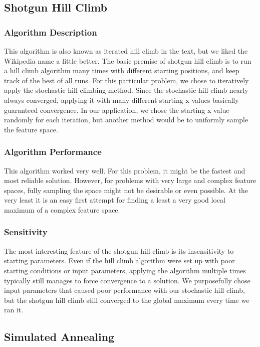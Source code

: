 \subsection{Shotgun Hill Climb}

\subsubsection{Algorithm Description}

This algorithm is also known as iterated hill climb in the text, but we liked the Wikipedia name a little better. The basic premise of shotgun hill climb is to run a hill  climb algorithm many times with different starting positions, and keep track of the best of all runs. For this particular problem, we chose to iteratively apply the stochastic hill climbing method. Since the stochastic hill climb nearly always converged, applying it with many different starting x values basically guaranteed convergence. In our application, we chose the starting x value randomly for each iteration, but another method would be to uniformly sample the feature space.

\subsubsection{Algorithm Performance}

This algorithm worked very well. For this problem, it might be the fastest and most reliable solution. However, for problems with very large and complex feature spaces, fully sampling the space might not be desirable or even possible. At the very least it is an easy first attempt for finding a least a very good local maximum of a complex feature space.

\subsubsection{Sensitivity}

The most interesting feature of the shotgun hill climb is its insensitivity to starting parameters. Even if the hill climb algorithm were set up with poor starting conditions or input parameters, applying the algorithm multiple times typically still manages to force convergence to a solution. We purposefully chose input parameters that caused poor performance with our stochastic hill climb, but the shotgun hill climb still converged to the global maximum every time we ran it.

\subsection{Simulated Annealing}

